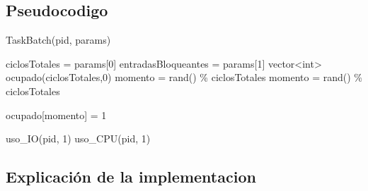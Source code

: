 \subsection{Pseudocodigo}

\begin{algorithm}[H]
\caption{TaskBatch(pid,  params)}
\label{pseudo:TaskBatch}
\begin{algorithmic}

\STATE ciclosTotales = params[0]
\STATE entradasBloqueantes = params[1]
\STATE vector<int> ocupado(ciclosTotales,0)
    \STATE momento = rand() \% ciclosTotales 
	\STATE momento = rand() \% ciclosTotales
    \ENDWHILE
    
    \STATE ocupado[momento] = 1
\ENDFOR

	\STATE uso\_IO(pid, 1)
\ELSE
	\STATE uso\_CPU(pid, 1)
\ENDIF
\ENDFOR
\end{algorithmic}
\end{algorithm}

\subsection{Explicación de la implementacion}